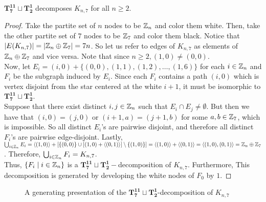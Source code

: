 \begin{thm} \label{thm:K_n,7}
    $\mathbf{T_{7}^{11}}\sqcup\mathbf{T_{2}^{1}}$ decomposes $K_{n,7}$ for all $n\geq 2$.
\end{thm}

\begin{proof}
    Take the partite set of $n$ nodes to be $\mathbb{Z}_{n}$ and color them white. Then, take the other partite set of $7$ nodes to be $\mathbb{Z}_{7}$ and color them black. Notice that $|E(K_{n,7})|=|\mathbb{Z}_{n}\oplus \mathbb{Z}_{7}|=7n$. So let us refer to edges of $K_{n,7}$ as elements of $\mathbb{Z}_{n}\oplus \mathbb{Z}_{7}$ and vice versa. Note that since $n\geq 2, (1,0)\neq (0,0)$.
    \\
    
    \noindent Now, let $E_{i}= (i,0)+\{(0,0),(1,1),(1,2),\hdots,(1,6)\}$ for each $i\in \mathbb{Z}_{n}$ and $F_{i}$ be the subgraph induced by $E_{i}$. Since each $F_{i}$ contains a path $(i,0)$ which is vertex disjoint from the star centered at the white $i+1$, it must be isomorphic to $\mathbf{T_{7}^{11}}\sqcup\mathbf{T_{2}^{1}}$.
    \\

    
    \noindent Suppose that there exist distinct $i,j\in \mathbb{Z}_{n}$ such that $E_{i}\cap E_{j}\neq \emptyset$. But then we have that $(i,0)=(j,0)$ or $(i+1,a)=(j+1,b)$ for some $a,b\in \mathbb{Z}_{7}$, which is impossible. So all distinct $E_{i}$'s are pairwise disjoint, and therefore all distinct $F_{i}$'s are pairwise edge-disjoint. Lastly, $\bigcup_{i\in \mathbb{Z}_{n}} E_{i}=\langle (1,0)\rangle + [\{(0,0)\}\cup [(1,0)+\langle (0,1)\rangle] \setminus \{(1,0)\}]=\langle (1,0)\rangle + \langle (0,1)\rangle = \langle (1,0),(0,1)\rangle = \mathbb{Z}_{n}\oplus \mathbb{Z}_{7}$. Therefore, $\bigcup_{i\in \mathbb{Z}_{n}} F_{i} = K_{n,7}$. 
    \\
    
    \noindent Thus, $\{F_{i}\mid i\in \mathbb{Z}_{n}\}$ is a $\mathbf{T_{7}^{11}}\sqcup\mathbf{T_{2}^{1}}-$decomposition of $K_{n,7}$. Furthermore, This decomposition is generated by developing the white nodes of $F_{0}$ by $1$.
\end{proof}

\begin{figure}[H]
    \centering
    
    \caption{A generating presentation of the $\mathbf{T_{7}^{11}}\sqcup\mathbf{T_{2}^{1}}$-decomposition of $K_{n,7}$}
    \label{fig:enter-label}
\end{figure}

